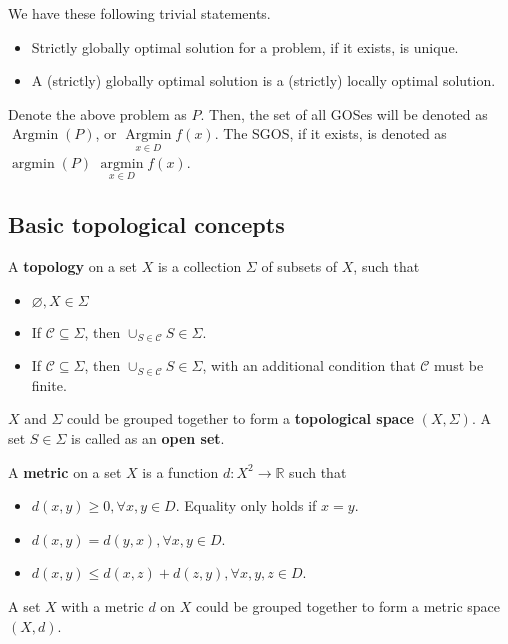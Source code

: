 We have these following trivial statements.
\begin{itemize}
  \item Strictly globally optimal solution for a problem, if it exists, is
    unique.
  \item A (strictly) globally optimal solution is a (strictly) locally
    optimal solution.
\end{itemize}

Denote the above problem as \( P \). Then, the set of all GOSes will be denoted
as \( \operatorname{Argmin}(P) \), or \( \operatorname{Argmin}\limits_{x \in D}
f(x) \). The SGOS, if it exists, is denoted as \( \operatorname{argmin}(P) \) \(
\operatorname{argmin}\limits_{x \in D} f(x) \).

\subsection{Basic topological concepts} %
\label{sub:Basic topological concepts}

\begin{definition}
A \textbf{topology} on a set \( X \) is a collection \( \Sigma \) of subsets of
\( X \), such that

\begin{itemize}
  \item \( \varnothing, X \in \Sigma \)
  \item If \( \mathcal{C} \subseteq \Sigma \), then \( \cup_{S \in
    \mathcal{C}} S \in \Sigma \).
  \item If \( \mathcal{C} \subseteq \Sigma \), then \( \cup_{S \in
    \mathcal{C}} S \in \Sigma \), with an additional condition that \(
    \mathcal{C} \) must be finite.
\end{itemize}

\( X \) and \( \Sigma \) could be grouped together to form a \textbf{topological
space} \( (X, \Sigma) \). A set \( S \in \Sigma \) is called as an \textbf{open
set}.

A \textbf{metric} on a set \( X \) is a function \( d: X^2 \to  \mathbb{R} \)
such that

\begin{itemize}
  \item \( d(x, y) \ge 0, \forall x, y \in D \). Equality only holds if \( x = y
    \).
  \item \( d(x, y) = d(y, x), \forall x, y \in D \).
  \item \( d(x, y) \le d(x, z) + d(z, y), \forall x, y, z \in D \).
\end{itemize}

A set \( X \)  with a metric \( d \) on \( X \) could be grouped together to
form a metric space \( (X, d) \).
\end{definition}

